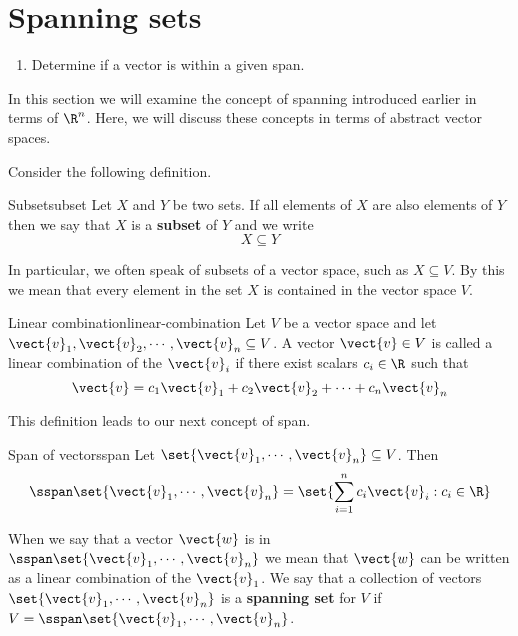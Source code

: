 \section{Spanning sets}

\begin{outcome}
  \begin{enumerate}
  \item Determine if a vector is within a given span.
  \end{enumerate}
\end{outcome}

In this section we will examine the concept of spanning introduced earlier in terms of $\R^n$. Here, we will discuss these concepts in terms of abstract vector spaces. 

Consider the following definition. 

\begin{definition}{Subset}{subset}
Let $X$ and $Y$ be two sets. If all elements of $X$ are also elements of $Y$ then we say that $X$ is a \textbf{subset} of $Y$ and we write
\[
X \subseteq Y
\]
\end{definition}

In particular, we often speak of subsets of a vector space, such as $X \subseteq V$. By this we mean that every element in the set $X$ is contained in the vector space $V$. 

\begin{definition}{Linear combination}{linear-combination}
Let $V$ be a vector space and let $\vect{v}_1, \vect{v}_2, \cdots, \vect{v}_n \subseteq V$. A vector $\vect{v} \in V$ is called a linear combination of the $\vect{v}_i$ if there exist scalars $c_i \in \R$ such that 
\[
\vect{v} = c_1 \vect{v}_1 + c_2 \vect{v}_2 + \cdots + c_n \vect{v}_n
\]
\end{definition}

This definition leads to our next concept of span.

\begin{definition}{Span of vectors}{span}
Let $\set{\vect{v}_{1},\cdots ,\vect{v}_{n}} \subseteq V$. Then
\begin{equation*}
\sspan\set{\vect{v}_{1},\cdots ,\vect{v}_{n}} = 
\set{\sum_{i=1}^{n}c_{i}\vect{v}_{i}: c_{i}\in \R
} 
\end{equation*}
\end{definition}

When we say that a vector $\vect{w}$ is in $\sspan\set{\vect{v}_{1},\cdots ,\vect{v}_{n}}$ we mean that $\vect{w}$ can be written as a linear combination of the $\vect{v}_1$. We say that a collection of vectors $\set{\vect{v}_{1},\cdots ,\vect{v}_{n}}$ is a \textbf{spanning set} for $V$ if $V = \sspan \set{\vect{v}_{1},\cdots ,\vect{v}_{n}}$. 

